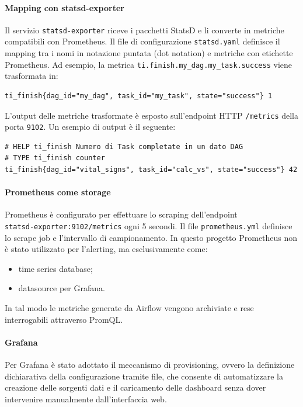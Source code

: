 \paragraph{Mapping con statsd-exporter}
Il servizio \texttt{statsd-exporter} riceve i pacchetti StatsD e li converte in metriche compatibili con Prometheus.  
Il file di configurazione \texttt{statsd.yaml} definisce il mapping tra i nomi in notazione puntata (dot notation) e metriche con etichette Prometheus.  
Ad esempio, la metrica \texttt{ti.finish.my\_dag.my\_task.success} viene trasformata in:
\begin{verbatim}
ti_finish{dag_id="my_dag", task_id="my_task", state="success"} 1
\end{verbatim}
L'output delle metriche trasformate è esposto sull'endpoint HTTP \texttt{/metrics} della porta \texttt{9102}.  
Un esempio di output è il seguente:
\begin{verbatim}
# HELP ti_finish Numero di Task completate in un dato DAG
# TYPE ti_finish counter
ti_finish{dag_id="vital_signs", task_id="calc_vs", state="success"} 42
\end{verbatim}

\paragraph{Prometheus come storage}
Prometheus è configurato per effettuare lo scraping dell’endpoint\\ \texttt{statsd-exporter:9102/metrics} ogni 5 secondi.  
Il file \texttt{prometheus.yml} definisce lo scrape job e l’intervallo di campionamento.  
In questo progetto Prometheus non è stato utilizzato per l’alerting, ma esclusivamente come:
\begin{itemize}
    \item time series database;
    \item datasource per Grafana.
\end{itemize}
In tal modo le metriche generate da Airflow vengono archiviate e rese interrogabili attraverso PromQL.

\paragraph{Grafana}
Per Grafana è stato adottato il meccanismo di provisioning, ovvero la definizione dichiarativa della configurazione tramite file, che consente di automatizzare la creazione delle sorgenti dati e il caricamento delle dashboard senza dover intervenire manualmente dall’interfaccia web.

